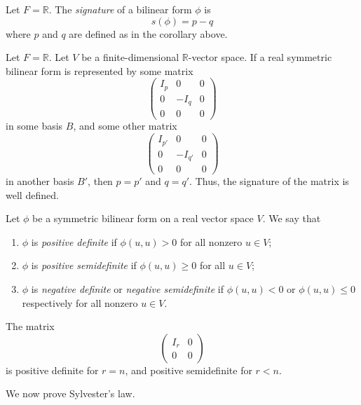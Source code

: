 \begin{definition}
	Let \( F = \mathbb R \).
	The \textit{signature} of a bilinear form \( \phi \) is
	\[
		s(\phi) = p - q
	\]
	where \( p \) and \( q \) are defined as in the corollary above.
\end{definition}
\begin{theorem}
	Let \( F = \mathbb R \).
	Let \( V \) be a finite-dimensional \( \mathbb R \)-vector space.
	If a real symmetric bilinear form is represented by some matrix
	\[
		\begin{pmatrix}
			I_p & 0    & 0 \\
			0   & -I_q & 0 \\
			0   & 0    & 0
		\end{pmatrix}
	\]
	in some basis \( B \), and some other matrix
	\[
		\begin{pmatrix}
			I_{p'} & 0       & 0 \\
			0      & -I_{q'} & 0 \\
			0      & 0       & 0
		\end{pmatrix}
	\]
	in another basis \( B' \), then \( p = p' \) and \( q = q' \).
	Thus, the signature of the matrix is well defined.
\end{theorem}
\begin{definition}
	Let \( \phi \) be a symmetric bilinear form on a real vector space \( V \).
	We say that
	\begin{enumerate}
		\item \( \phi \) is \textit{positive definite} if \( \phi(u,u) > 0 \) for all nonzero \( u \in V \);
		\item \( \phi \) is \textit{positive semidefinite} if \( \phi(u,u) \geq 0 \) for all \( u \in V \);
		\item \( \phi \) is \textit{negative definite} or \textit{negative semidefinite} if \( \phi(u,u) < 0 \) or \( \phi(u,u) \leq 0 \) respectively for all nonzero \( u \in V \).
	\end{enumerate}
\end{definition}
\begin{example}
	The matrix
	\[
		\begin{pmatrix}
			I_r & 0 \\
			0   & 0
		\end{pmatrix}
	\]
	is positive definite for \( r = n \), and positive semidefinite for \( r < n \).
\end{example}
We now prove Sylvester's law.

